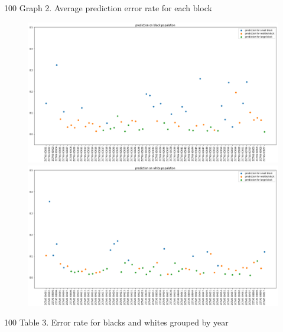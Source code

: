 \documentclass{article}
\begin{document}
\clearpage
\centerline{{\color{white} 100} Graph 2. Average prediction error rate for each block}
\begin{figure}[!h] 
\centering 
\includegraphics[width=1.2\textwidth]{graph3.png} 
\includegraphics[width=1.2\textwidth]{graph4.png} 
\end{figure}
\clearpage
\centerline{{\color{white} 100} Table 3. Error rate for blacks and whites grouped by year}
\end{document}
